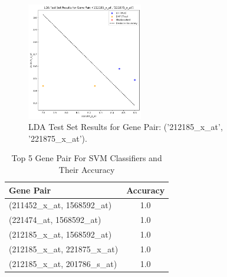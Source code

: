 \documentclass[final]{article}
\begin{document}
        \begin{figure}[H]
            \centering
            \includegraphics[width=0.45\textwidth]{212185_x_at, 221875_x_at.png}
            \caption{LDA Test Set Results for Gene Pair: ('212185\_x\_at', '221875\_x\_at').}
            \label{fig:lda-test-results}
        \end{figure}
\newpage
\begin{table}[H]
\centering
\caption{Top 5 Gene Pair For SVM Classifiers and Their Accuracy}
\begin{tabular}{lc}
\toprule
\textbf{Gene Pair} & \textbf{Accuracy} \\
\midrule
(211452\_x\_at, 1568592\_at) & 1.0 \\
(221474\_at, 1568592\_at)    & 1.0 \\
(212185\_x\_at, 1568592\_at) & 1.0 \\
(212185\_x\_at, 221875\_x\_at) & 1.0 \\
(212185\_x\_at, 201786\_s\_at) & 1.0 \\
\bottomrule
\end{tabular}
\end{table}
\end{document}
